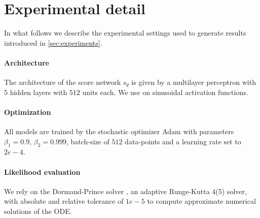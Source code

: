 \section{Experimental detail}
\label{sec:exp_detail}

In what follows we describe the experimental settings used to generate results introduced in \cref{sec:experiments}.


\paragraph{Architecture}
The architecture of the score network $s_\theta$ is given by a multilayer perceptron with 5 hidden layers with $512$ units each.
We use on sinusoidal activation functions.


\paragraph{Optimization}
All models are trained by the stochastic optimizer Adam \citep{kingma2015Adam}
with parameters $\beta_1=0.9$, $\beta_2=0.999$, batch-size of $512$ data-points and a learning rate set to $2e-4$.

\paragraph{Likelihood evaluation}
We rely on the Dormand-Prince solver \citep{dormand1980family}, an adaptive Runge-Kutta 4(5) solver, with absolute and relative tolerance of $1e-5$ to compute approximate numerical solutions of the ODE.
